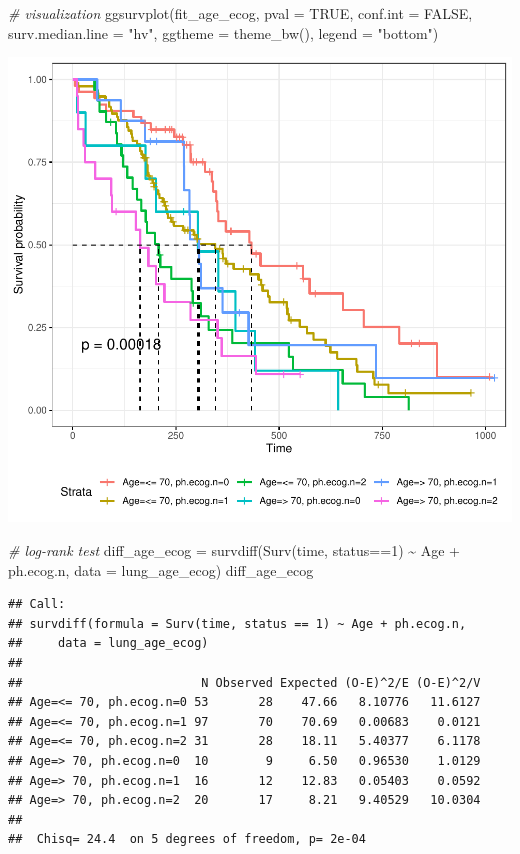 \documentclass[
]{article}
\newenvironment{Shaded}{\begin{snugshade}}{\end{snugshade}}
\newcommand{\AttributeTok}[1]{\textcolor[rgb]{0.77,0.63,0.00}{#1}}
\newcommand{\CommentTok}[1]{\textcolor[rgb]{0.56,0.35,0.01}{\textit{#1}}}
\newcommand{\ConstantTok}[1]{\textcolor[rgb]{0.00,0.00,0.00}{#1}}
\newcommand{\DecValTok}[1]{\textcolor[rgb]{0.00,0.00,0.81}{#1}}
\newcommand{\FunctionTok}[1]{\textcolor[rgb]{0.00,0.00,0.00}{#1}}
\newcommand{\NormalTok}[1]{#1}
\newcommand{\OtherTok}[1]{\textcolor[rgb]{0.56,0.35,0.01}{#1}}
\newcommand{\SpecialCharTok}[1]{\textcolor[rgb]{0.00,0.00,0.00}{#1}}
\newcommand{\StringTok}[1]{\textcolor[rgb]{0.31,0.60,0.02}{#1}}
\begin{document}
\begin{Shaded}
\begin{Highlighting}[]
\CommentTok{\# visualization}
\FunctionTok{ggsurvplot}\NormalTok{(fit\_age\_ecog,}
           \AttributeTok{pval =} \ConstantTok{TRUE}\NormalTok{, }\AttributeTok{conf.int =} \ConstantTok{FALSE}\NormalTok{,}
           \AttributeTok{surv.median.line =} \StringTok{"hv"}\NormalTok{, }
           \AttributeTok{ggtheme =} \FunctionTok{theme\_bw}\NormalTok{(), }
           \AttributeTok{legend =} \StringTok{"bottom"}\NormalTok{)}
\end{Highlighting}
\end{Shaded}

\includegraphics{final_project_files/figure-latex/unnamed-chunk-24-1.pdf}

\begin{Shaded}
\begin{Highlighting}[]
\CommentTok{\# log{-}rank test}
\NormalTok{diff\_age\_ecog }\OtherTok{=} \FunctionTok{survdiff}\NormalTok{(}\FunctionTok{Surv}\NormalTok{(time, status}\SpecialCharTok{==}\DecValTok{1}\NormalTok{) }\SpecialCharTok{\textasciitilde{}}\NormalTok{ Age }\SpecialCharTok{+}\NormalTok{ ph.ecog.n, }\AttributeTok{data =}\NormalTok{ lung\_age\_ecog) }
\NormalTok{diff\_age\_ecog}
\end{Highlighting}
\end{Shaded}

\begin{verbatim}
## Call:
## survdiff(formula = Surv(time, status == 1) ~ Age + ph.ecog.n, 
##     data = lung_age_ecog)
## 
##                         N Observed Expected (O-E)^2/E (O-E)^2/V
## Age=<= 70, ph.ecog.n=0 53       28    47.66   8.10776   11.6127
## Age=<= 70, ph.ecog.n=1 97       70    70.69   0.00683    0.0121
## Age=<= 70, ph.ecog.n=2 31       28    18.11   5.40377    6.1178
## Age=> 70, ph.ecog.n=0  10        9     6.50   0.96530    1.0129
## Age=> 70, ph.ecog.n=1  16       12    12.83   0.05403    0.0592
## Age=> 70, ph.ecog.n=2  20       17     8.21   9.40529   10.0304
## 
##  Chisq= 24.4  on 5 degrees of freedom, p= 2e-04
\end{verbatim}
\end{document}
